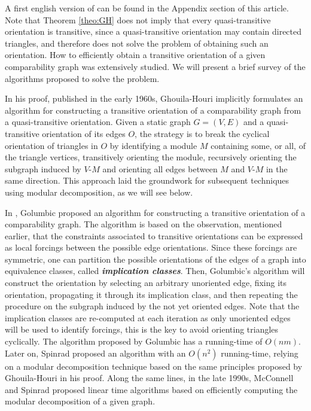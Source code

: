 \documentclass[runningheads]{llncs}
\newcommand{\bfit}[1]{\textbf{\textit{#1}}}
\begin{document}
A first  english version of \cite{GhouilaHouri} can be found in the Appendix section of this article. Note that Theorem \ref{theo:GH} does not imply that every quasi-transitive orientation is transitive, since a quasi-transitive orientation may contain directed triangles, and therefore does not solve the problem of obtaining such an orientation.
How to efficiently obtain a transitive orientation of a given comparability graph was extensively studied. We will present a brief survey of the algorithms proposed to solve the problem.

In his proof, published in the early 1960s, Ghouila-Houri implicitly formulates an algorithm for constructing a transitive orientation of a comparability graph from a quasi-transitive orientation. Given a static graph $G=(V,E)$ and a quasi-transitive orientation of its edges $O$, the strategy is to break the cyclical orientation of triangles in $O$ by identifying a module $M$ containing some, or all, of the triangle vertices, transitively orienting the module, recursively orienting the subgraph induced by $V$-$M$ and orienting all edges between $M$ and $V$-$M$ in the same direction. This approach laid the groundwork for subsequent techniques using modular decomposition, as we will see below.

In \cite{Golumbic2nd}, Golumbic proposed an algorithm for constructing a transitive orientation of a comparability graph. The algorithm is based on the observation, mentioned earlier, that the constraints associated to transitive orientations can be expressed as local forcings between the possible edge orientations. Since these forcings are symmetric, one can partition the possible orientations of the edges of a graph into equivalence classes, called  \bfit{implication classes}. Then, Golumbic's algorithm will construct the orientation by selecting an arbitrary unoriented edge, fixing its orientation, propagating it through its implication class, and then repeating the procedure on the subgraph induced by the not yet oriented edges. Note that the implication classes are re-computed at each iteration as only unoriented edges will be used to identify forcings, this is the key to avoid orienting triangles cyclically. The algorithm proposed by Golumbic has a running-time of $O(nm)$. Later on, Spinrad \cite{spinrad1985comparability} proposed an algorithm with an $O(n^2)$ running-time, relying on a modular decomposition technique based on the same principles proposed by Ghouila-Houri in his proof. Along the same lines, in the late 1990s, McConnell and Spinrad \cite{mcconnell1999modular} proposed linear time algorithms based on efficiently computing the modular decomposition of a given graph.
\end{document}
